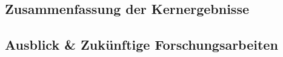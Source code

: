 \subsection{Zusammenfassung der Kernergebnisse}

\subsection{Ausblick \& Zukünftige Forschungsarbeiten}
